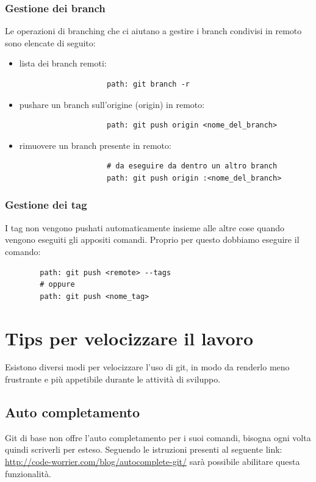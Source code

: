 		\subsubsection{Gestione dei branch} %
		\label{ssub:gestione_dei_branch_remoto}
		Le operazioni di branching che ci aiutano a gestire i branch condivisi in remoto sono elencate di seguito:
			\begin{itemize}
				\item lista dei branch remoti:
					\begin{verbatim}
					path: git branch -r
					\end{verbatim}
				\item pushare un branch sull'origine (origin) in remoto:
					\begin{verbatim}
					path: git push origin <nome_del_branch>
					\end{verbatim}
				\item rimuovere un branch presente in remoto:
					\begin{verbatim}
					# da eseguire da dentro un altro branch
					path: git push origin :<nome_del_branch>
					\end{verbatim}
			\end{itemize}
			\noindent
		\subsubsection{Gestione dei tag} %
		\label{ssub:gestione_dei_tag_remoto}
		I tag non vengono pushati automaticamente insieme alle altre cose quando vengono eseguiti gli appositi comandi. Proprio per questo dobbiamo eseguire il comando:
		\begin{verbatim}
		path: git push <remote> --tags
		# oppure
		path: git push <nome_tag>
		\end{verbatim}



\newpage \clearpage
\section{Tips per velocizzare il lavoro} %
\label{sec:tips_per_velocizzare_il_lavoro}
Esistono diversi modi per velocizzare l'uso di git, in modo da renderlo meno frustrante e più appetibile durante le attività di sviluppo.
	\subsection{Auto completamento} %
	\label{sub:auto_completamento}
	Git di base non offre l'auto completamento per i suoi comandi, bisogna ogni volta quindi scriverli per esteso. Seguendo le istruzioni presenti al seguente link: \url{http://code-worrier.com/blog/autocomplete-git/} sarà possibile abilitare questa funzionalità.

